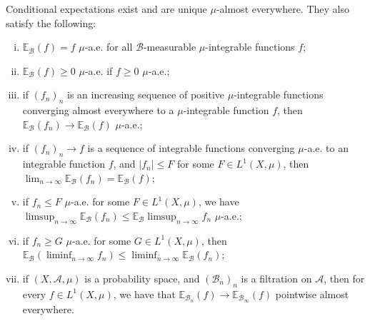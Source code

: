 \documentclass[10pt]{mypackage}
\begin{document}
\begin{theorem}
  Conditional expectations exist and are unique $\mu$-almost everywhere. They also satisfy the following:
  \begin{enumerate}[(i)]
    \item $ \mathbb{E}_{\mathcal{B}}\left( f \right) = f$ $\mu$-a.e. for all $\mathcal{B}$-measurable $\mu$-integrable functions $f$;
    \item $ \mathbb{E}_{\mathcal{B}}\left( f \right) \geq 0 $ $\mu$-a.e. if $f\geq 0$ $\mu$-a.e.;
    \item if $\left( f_n \right)_n$ is an increasing sequence of positive $\mu$-integrable functions converging almost everywhere to a $\mu$-integrable function $f$, then $ \mathbb{E}_{\mathcal{B}}\left( f_n \right)\to \mathbb{E}_{\mathcal{B}}\left( f \right) $ $\mu$-a.e.;
    \item if $\left( f_n \right)_n\to f$ is a sequence of integrable functions converging $\mu$-a.e. to an integrable function $f$, and $\left\vert f_n \right\vert\leq F$ for some $F\in L^1\left( X,\mu \right)$, then $\lim_{n\to\infty} \mathbb{E}_{\mathcal{B}}\left( f_n \right) = \mathbb{E}_{\mathcal{B}}\left( f \right)$;
    \item if $f_n\leq F$ $\mu$-a.e. for some $F\in L^1\left( X,\mu \right)$, we have $\limsup_{n\to\infty} \mathbb{E}_{\mathcal{B}}\left( f_n \right)\leq \mathbb{E}_{\mathcal{B}}\limsup_{n\to\infty}f_n$ $\mu$-a.e.;
    \item if $f_n\geq G$ $\mu$-a.e. for some $G\in L^1\left( X,\mu \right)$, then $ \mathbb{E}_{\mathcal{B}} \left( \liminf_{n\to\infty}f_n \right)\leq \liminf_{n\to\infty} \mathbb{E}_{\mathcal{B}}\left( f_n \right)$;
    \item if $\left( X, \mathcal{A},\mu \right)$ is a probability space, and $\left( \mathcal{B}_n \right)_{n}$ is a filtration on $\mathcal{A}$, then for every $f\in L^1\left( X,\mu \right)$, we have that $ \mathbb{E}_{\mathcal{B}_n}\left( f \right)\to \mathbb{E}_{\mathcal{B}_{\infty}}\left( f \right) $ pointwise almost everywhere.
  \end{enumerate}
\end{theorem}
\end{document}
